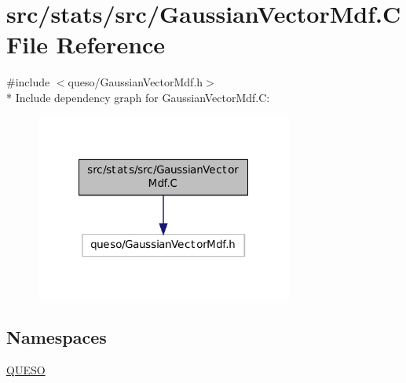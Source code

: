 \hypertarget{_gaussian_vector_mdf_8_c}{\section{src/stats/src/\-Gaussian\-Vector\-Mdf.C File Reference}
\label{_gaussian_vector_mdf_8_c}
}
{\ttfamily \#include $<$queso/\-Gaussian\-Vector\-Mdf.\-h$>$}\\*
Include dependency graph for Gaussian\-Vector\-Mdf.\-C\-:
\nopagebreak
\begin{figure}[H]
\begin{center}
\leavevmode
\includegraphics[width=240pt]{_gaussian_vector_mdf_8_c__incl}
\end{center}
\end{figure}
\subsection*{Namespaces}
\begin{DoxyCompactItemize}
\item 
\hyperlink{namespace_q_u_e_s_o}{Q\-U\-E\-S\-O}
\end{DoxyCompactItemize}
